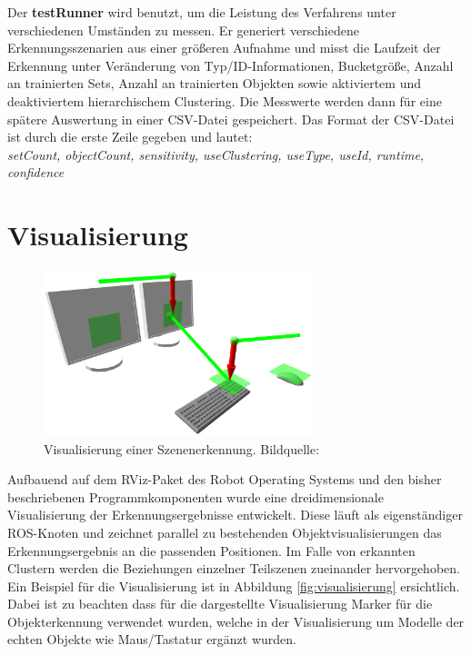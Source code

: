Der \textbf{testRunner} wird benutzt, um die Leistung des Verfahrens unter verschiedenen Umständen zu messen.
Er generiert verschiedene Erkennungsszenarien aus einer größeren Aufnahme und misst die Laufzeit der Erkennung unter Veränderung von Typ/ID-Informationen, Bucketgröße, Anzahl an trainierten Sets, Anzahl an trainierten Objekten sowie aktiviertem und deaktiviertem hierarchischem Clustering.
Die Messwerte werden dann für eine spätere Auswertung in einer CSV-Datei gespeichert.
Das Format der CSV-Datei ist durch die erste Zeile gegeben und lautet:\\
\emph{setCount, objectCount, sensitivity, useClustering, useType, useId, runtime, confidence}

\section{Visualisierung}\label{impl:visualisierung}

\begin{figure}
  \centering
  \includegraphics[width=0.7\textwidth]{bilder/paper_fotos/s1.png}
  \caption{Visualisierung einer Szenenerkennung. Bildquelle: \cite{P.MeissnerandR.RecklingandR.JaekelandS.R.Schmidt-RohrandR.Dillmann2013}}
  \label{fig:visualisierung}
\end{figure}

Aufbauend auf dem RViz-Paket des Robot Operating Systems und den bisher beschriebenen Programmkomponenten wurde eine dreidimensionale Visualisierung der Erkennungsergebnisse entwickelt.
Diese läuft als eigenständiger ROS-Knoten und zeichnet parallel zu bestehenden Objektvisualisierungen das Erkennungsergebnis an die passenden Positionen.
Im Falle von erkannten Clustern werden die Beziehungen einzelner Teilszenen zueinander hervorgehoben.
Ein Beispiel für die Visualisierung ist in Abbildung \vref{fig:visualisierung} ersichtlich.
Dabei ist zu beachten dass für die dargestellte Visualisierung Marker für die Objekterkennung verwendet wurden, welche in der Visualisierung um Modelle der echten Objekte wie Maus/Tastatur ergänzt wurden.

